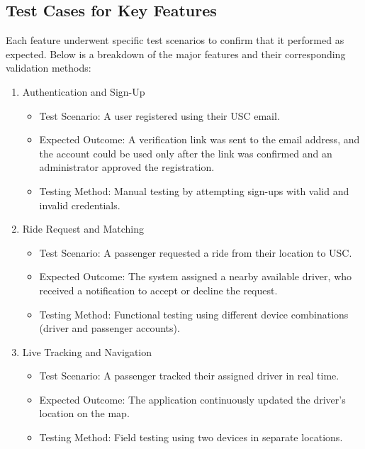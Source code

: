 \subsection{Test Cases for Key Features} %
\indent Each feature underwent specific test scenarios to confirm that it performed as expected. Below is a breakdown of the major features and their corresponding validation methods:
\begin{enumerate}
    \item Authentication and Sign-Up
        \begin{itemize}
            \item Test Scenario: A user registered using their USC email.
            \item Expected Outcome: 
            A verification link was sent to the email address, and the account could be used only after the link was confirmed and an administrator approved the registration.
            \item Testing Method: Manual testing by attempting sign-ups with valid and invalid credentials.
        \end{itemize}

    \item Ride Request and Matching
        \begin{itemize}
            \item Test Scenario: A passenger requested a ride from their location to USC.
            \item Expected Outcome: The system assigned a nearby available driver, who received a notification to accept or decline the request.
            \item Testing Method: Functional testing using different device combinations (driver and passenger accounts).
        \end{itemize}

    \item Live Tracking and Navigation
        \begin{itemize}
            \item Test Scenario: A passenger tracked their assigned driver in real time.
            \item Expected Outcome: The application continuously updated the driver’s location on the map.
            \item Testing Method: Field testing using two devices in separate locations.
        \end{itemize}
        

\end{enumerate}
